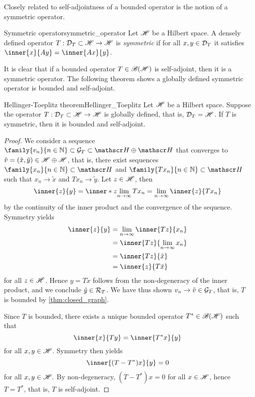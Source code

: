 Closely related to self-adjointness of a bounded operator is the notion of a symmetric operator.
\begin{definition}{Symmetric operator}{symmetric_operator}
    Let \(\mathscr{H}\) be a Hilbert space. A densely defined operator \(T : \mathcal{D}_{T} \subset \mathscr{H} \to \mathscr{H}\) is \emph{symmetric} if for all \(x, y \in \mathcal{D}_{T}\) it satisfies \(\inner{x}{Ay} = \inner{Ax}{y}\).
\end{definition}
It is clear that if a bounded operator \(T \in \mathscr{B}(\mathscr{H})\) is self-adjoint, then it is a symmetric operator. The following theorem shows a globally defined symmetric operator is bounded and self-adjoint.
\begin{theorem}{Hellinger-Toeplitz theorem}{Hellinger_Toeplitz}
    Let \(\mathscr{H}\) be a Hilbert space. Suppose the operator \(T : \mathcal{D}_{T} \subset \mathscr{H} \to \mathscr{H}\) is globally defined, that is, \(\mathcal{D}_{T} = \mathscr{H}\). If \(T\) is symmetric, then it is bounded and self-adjoint.
\end{theorem}
\begin{proof}
    We consider a sequence \(\family{v_n}{n \in \mathbb{N}} \subset \graph{T} \subset \hilbert \oplus \hilbert\) that converges to \(\tilde{v} = (\tilde{x}, \tilde{y}) \in \mathscr{H}\oplus\mathscr{H}\), that is, there exist sequences \(\family{x_n}{n \in \mathbb{N}} \subset \hilbert\) and \(\family{Tx_n}{n \in \mathbb{N}} \subset \hilbert\) such that \(x_n \to \tilde{x}\) and \(Tx_n \to \tilde{y}\). Let \(z \in \mathscr{H}\), then
    \begin{equation*}
        \inner{z}{y} = \inner*{z}{\lim_{n \to \infty}{Tx_n}} = \lim_{n\to \infty}{\inner{z}{Tx_n}}
    \end{equation*}
    by the continuity of the inner product and the convergence of the sequence. Symmetry yields
    \begin{align*}
        \inner{z}{y} &= \lim_{n\to\infty}{\inner{Tz}{x_n}} \\&= \inner{Tz}{\lim_{n\to\infty}{x_n}} \\&= \inner{Tz}{\tilde{x}}\\
                     &= \inner{z}{T\tilde{x}}
    \end{align*}
    for all \(z \in \mathscr{H}\). Hence \(y = T\tilde{x}\) follows from the non-degeneracy of the inner product, and we conclude \(\tilde{y} \in \mathcal{R}_{T}\). We have thus shown \(v_n \to \tilde{v} \in \mathcal{G}_{T}\), that is, \(T\) is bounded by \cref{thm:closed_graph}.

    Since \(T\) is bounded, there exists a unique bounded operator \(T^* \in \mathscr{B}(\mathscr{H})\) such that
    \begin{equation*}
        \inner{x}{Ty} = \inner{T^*x}{y}
    \end{equation*}
    for all \(x, y \in \mathscr{H}\). Symmetry then yields
    \begin{equation*}
        \inner{(T - T^*)x}{y} = 0
    \end{equation*}
    for all \(x, y \in \mathscr{H}.\) By non-degeneracy, \((T - T^*)x = 0\) for all \(x \in \mathscr{H}\), hence \(T = T^*\), that is, \(T\) is self-adjoint.
\end{proof}
